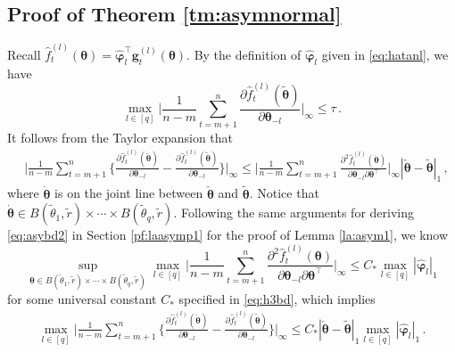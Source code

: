 \documentclass[12pt]{article}
\makeatletter
\newcommand{\btheta}{\boldsymbol \theta}
\newcommand{\bvarphi}{\boldsymbol \varphi}
\def\T{{\scriptscriptstyle \top} }
\newcommand{\bg}{{\mathbf g}}
\newcommand{\btc}{{\rm c}}
\newcommand{\0}{{\bf 0}}
\DeclareRobustCommand\widecheck[1]{{\mathpalette\@widecheck{#1}}}
\def\@widecheck#1#2{%
	\setbox\z@\hbox{\m@th$#1#2$}%
	\setbox\tw@\hbox{\m@th$#1%
		\widehat{%
			\vrule\@width\z@\@height\ht\z@
			\vrule\@height\z@\@width\wd\z@}$}%
	\dp\tw@-\ht\z@
	\@tempdima\ht\z@ \advance\@tempdima2\ht\tw@ \divide\@tempdima\thr@@
	\setbox\tw@\hbox{%
		\raise\@tempdima\hbox{\scalebox{1}[-1]{\lower\@tempdima\box
				\tw@}}}%
	{\ooalign{\box\tw@ \cr \box\z@}}}
\makeatother
\begin{document}
\subsection{Proof of Theorem \ref{tm:asymnormal}} \label{pr:tm:asymnormal}
Recall $\hat{f}_t^{(l)}(\btheta)=\hat{\bvarphi}_{l}^{\T}\bg_t^{(l)}(\btheta)$. By the definition of $\hat{\bvarphi}_{l}$ given in \eqref{eq:hatanl}, we have 
\[
\max_{l\in[q]}\bigg|\frac{1}{n-m}\sum_{t=m+1}^n\frac{\partial\hat{f}_t^{(l)}(\tilde{\btheta})}{\partial\btheta_{-l}}\bigg|_\infty\leq \tau\,.
\]
It follows from the Taylor expansion that
\begin{align*}
&\bigg|\frac{1}{n-m}\sum_{t=m+1}^n\bigg\{\frac{\partial \hat{f}_t^{(l)}(\check{\btheta})}{\partial\btheta_{-l}}-\frac{\partial\hat{f}_t^{(l)}(\tilde{\btheta})}{\partial\btheta_{-l}}\bigg\}\bigg|_\infty\leq \bigg|\frac{1}{n-m}\sum_{t=m+1}^n\frac{\partial^2\hat{f}_t^{(l)}(\dot{\btheta})}{\partial\btheta_{-l}\partial\btheta^{\T}}\bigg|_\infty|\check{\btheta}-\tilde{\btheta}|_1\,,
\end{align*}
where $\dot{\btheta}$ is on the joint line between $\check{\btheta}$ and $\tilde{\btheta}$. %
Notice that $\dot{\btheta}\in B(\tilde{\theta}_1,\tilde{r})\times\cdots\times B(\tilde{\theta}_q,\tilde{r})$. 
Following the same arguments for deriving \eqref{eq:asybd2} in Section \ref{pf:laasymp1} for the proof of Lemma \ref{la:asym1}, we know 
\[
\sup_{\btheta\in B(\tilde{\theta}_1,\tilde{r})\times\cdots\times B(\tilde{\theta}_q,\tilde{r})}\max_{l\in[q]}\bigg|\frac{1}{n-m}\sum_{t=m+1}^n\frac{\partial^2\hat{f}_t^{(l)}({\btheta})}{\partial\btheta_{-l}\partial\btheta^{\T}}\bigg|_\infty\leq C_*\max_{l\in[q]}|\hat{\bvarphi}_l|_1
\]
for some universal constant $C_*$ specified in \eqref{eq:h3bd}, which implies
\begin{align*}
\max_{l\in[q]}\bigg|\frac{1}{n-m}\sum_{t=m+1}^n\bigg\{\frac{\partial \hat{f}_t^{(l)}(\check{\btheta})}{\partial\btheta_{-l}}-\frac{\partial\hat{f}_t^{(l)}(\tilde{\btheta})}{\partial\btheta_{-l}}\bigg\}\bigg|_\infty\leq C_*|\check{\btheta}-\tilde{\btheta}|_1\max_{l\in[q]}|\hat{\bvarphi}_l|_1\,.
\end{align*}
\end{document}
